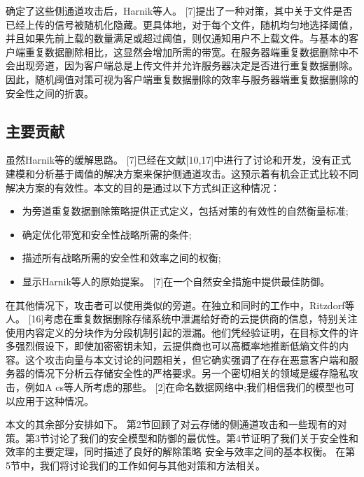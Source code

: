 确定了这些侧通道攻击后，Harnik等人。 [7]提出了一种对策，其中关于文件是否已经上传的信号被随机化隐藏。更具体地，对于每个文件，随机均匀地选择阈值，并且如果先前上载的数量满足或超过阈值，则仅通知用户不上载文件。与基本的客户端重复数据删除相比，这显然会增加所需的带宽。在服务器端重复数据删除中不会出现旁道，因为客户端总是上传文件并允许服务器决定是否进行重复数据删除。因此，随机阈值对策可视为客户端重复数据删除的效率与服务器端重复数据删除的安全性之间的折衷。

\subsection{主要贡献}

虽然Harnik等的缓解思路。 [7]已经在文献[10,17]中进行了讨论和开发，没有正式建模和分析基于阈值的解决方案来保护侧通道攻击。这预示着有机会正式比较不同解决方案的有效性。本文的目的是通过以下方式纠正这种情况：
\begin{itemize}
    \item 为旁道重复数据删除策略提供正式定义，包括对策的有效性的自然衡量标准;
    \item 确定优化带宽和安全性战略所需的条件;
    \item 描述所有战略所需的安全性和效率之间的权衡;
    \item 显示Harnik等人的原始提案。 [7]在一个自然安全措施中提供最佳防御。
\end{itemize}


在其他情况下，攻击者可以使用类似的旁道。在独立和同时的工作中，Ritzdorf等人。 [16]考虑在重复数据删除存储系统中泄漏给好奇的云提供商的信息，特别关注使用内容定义的分块作为分段机制引起的泄漏。他们凭经验证明，在目标文件的许多强烈假设下，即使加密密钥未知，云提供商也可以高概率地推断低熵文件的内容。这个攻击向量与本文讨论的问题相关，但它确实强调了在存在恶意客户端和服务器的情况下分析云存储安全性的严格要求。另一个密切相关的领域是缓存隐私攻击，例如A cs等人所考虑的那些。 [2]在命名数据网络中;我们相信我们的模型也可以应用于这种情况。

本文的其余部分安排如下。 第2节回顾了对云存储的侧通道攻击和一些现有的对策。第3节讨论了我们的安全模型和防御的最优性。第4节证明了我们关于安全性和效率的主要定理，同时描述了良好的解除策略 安全与效率之间的基本权衡。 在第5节中，我们将讨论我们的工作如何与其他对策和方法相关。

